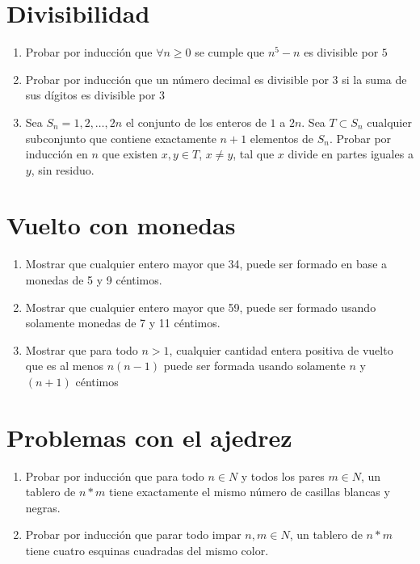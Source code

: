 \documentclass{article}
\begin{document}
\section{Divisibilidad}

\begin{enumerate}
  \item Probar por inducción que $\forall n \geq 0$ se cumple que
$n^5-n$ es divisible por $5$

  \item Probar por inducción que un número decimal es divisible por $3$ si la suma de sus dígitos es divisible por $3$

  \item Sea $S_{n}={1,2,\ldots,2n}$ el conjunto de los enteros de
$1$ a $2n$. Sea $T \subset S_{n}$ cualquier subconjunto que
contiene exactamente $n+1$ elementos de $S_{n}$. Probar por
inducción en $n$ que existen $x, y \in T$, $x\neq y$, tal que $x$
divide en partes iguales a $y$, sin residuo.
  
\end{enumerate}

\section{Vuelto con monedas}

\begin{enumerate}
  \item Mostrar que cualquier entero mayor que 34, puede ser formado en base a monedas de 5 y 9 céntimos.
  
  \item Mostrar que cualquier entero mayor que 59, puede ser formado usando solamente monedas de 7 y 11 céntimos.
  
  \item Mostrar que para todo $n>1$, cualquier cantidad entera positiva de vuelto que es al menos $n(n-1)$ puede ser formada usando solamente $n$ y $(n+1)$ céntimos
\end{enumerate}

\section{Problemas con el ajedrez}

\begin{enumerate}
  \item Probar por inducción que para todo $n\in N$ y todos los
pares $m\in N$, un tablero de $n*m$ tiene exactamente el mismo
número de casillas blancas y negras.

  \item Probar por inducción que parar todo impar $n, m\in N$, un
tablero de $n*m$ tiene cuatro esquinas cuadradas del mismo color.

\end{enumerate}
\end{document}
